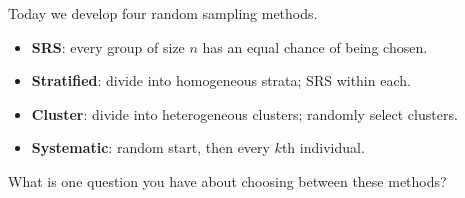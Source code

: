 \documentclass[10pt]{article}
\begin{document}
\vspace{0.12in}

\noindent Today we develop four random sampling methods.

\vspace{0.14in}

\begin{tcolorbox}[colback=greenbg, colframe=greenacc, boxrule=0.8pt, arc=2mm,
    left=4mm, right=4mm, top=3mm, bottom=3mm]
    \small
    \begin{itemize}[leftmargin=1.3em, itemsep=8pt]
  \item \textbf{SRS}: every group of size $n$ has an equal chance of being chosen.
  \item \textbf{Stratified}: divide into homogeneous strata; SRS within each.
  \item \textbf{Cluster}: divide into heterogeneous clusters; randomly select clusters.
  \item \textbf{Systematic}: random start, then every $k$th individual.
    \end{itemize}
\end{tcolorbox}

\vspace{0.2in}

\noindent\textcolor{slate}{\small What is one question you have about choosing between
these methods?}\\[8pt]
\writeline\\[2pt]\writeline
\end{document}
